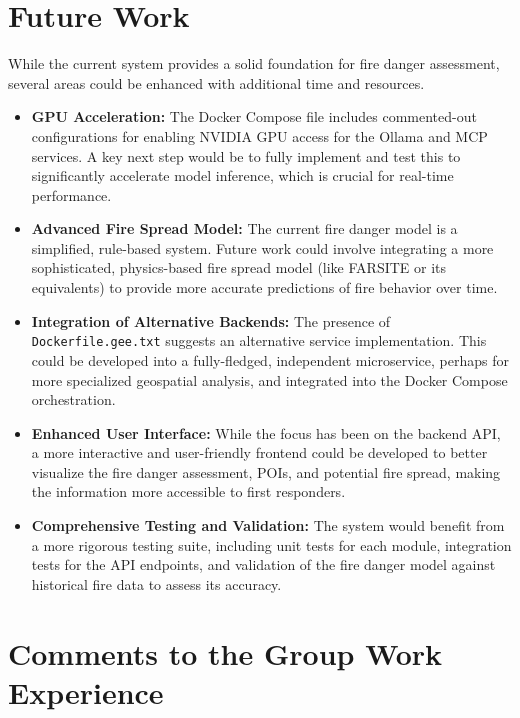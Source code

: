 \documentclass[lang=english,inputenc=utf8,fontsize=10pt]{ldvarticle}
\begin{document}
\section*{Future Work}
While the current system provides a solid foundation for fire danger assessment, several areas could be enhanced with additional time and resources.
\begin{itemize}
    \item \textbf{GPU Acceleration:} The Docker Compose file includes commented-out configurations for enabling NVIDIA GPU access for the Ollama and MCP services. A key next step would be to fully implement and test this to significantly accelerate model inference, which is crucial for real-time performance.
    \item \textbf{Advanced Fire Spread Model:} The current fire danger model is a simplified, rule-based system. Future work could involve integrating a more sophisticated, physics-based fire spread model (like FARSITE or its equivalents) to provide more accurate predictions of fire behavior over time.
    \item \textbf{Integration of Alternative Backends:} The presence of \texttt{Dockerfile.gee.txt} suggests an alternative service implementation. This could be developed into a fully-fledged, independent microservice, perhaps for more specialized geospatial analysis, and integrated into the Docker Compose orchestration.
    \item \textbf{Enhanced User Interface:} While the focus has been on the backend API, a more interactive and user-friendly frontend could be developed to better visualize the fire danger assessment, POIs, and potential fire spread, making the information more accessible to first responders.
    \item \textbf{Comprehensive Testing and Validation:} The system would benefit from a more rigorous testing suite, including unit tests for each module, integration tests for the API endpoints, and validation of the fire danger model against historical fire data to assess its accuracy.
\end{itemize}

\newpage

\section{Comments to the Group Work Experience}

\lipsum[22]



\end{document}
